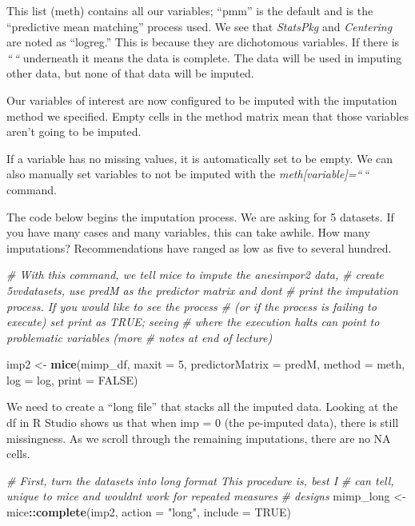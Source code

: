 \documentclass[
  11pt,
]{book}
\newenvironment{Shaded}{\begin{snugshade}}{\end{snugshade}}
\newcommand{\AttributeTok}[1]{\textcolor[rgb]{0.27,0.27,0.27}{#1}}
\newcommand{\CommentTok}[1]{\textcolor[rgb]{0.37,0.37,0.37}{\textit{#1}}}
\newcommand{\ConstantTok}[1]{\textcolor[rgb]{0.37,0.37,0.37}{#1}}
\newcommand{\DecValTok}[1]{\textcolor[rgb]{0.06,0.06,0.06}{#1}}
\newcommand{\FunctionTok}[1]{\textcolor[rgb]{0.27,0.27,0.27}{\textbf{#1}}}
\newcommand{\NormalTok}[1]{#1}
\newcommand{\OtherTok}[1]{\textcolor[rgb]{0.37,0.37,0.37}{#1}}
\newcommand{\SpecialCharTok}[1]{\textcolor[rgb]{0.43,0.43,0.43}{\textbf{#1}}}
\newcommand{\StringTok}[1]{\textcolor[rgb]{0.5,0.5,0.5}{#1}}
\begin{document}
This list (meth) contains all our variables; ``pmm'' is the default and is the ``predictive mean matching'' process used. We see that \emph{StatsPkg} and \emph{Centering} are noted as ``logreg.'' This is because they are dichotomous variables. If there is \emph{``\,``} underneath it means the data is complete. The data will be used in imputing other data, but none of that data will be imputed.

Our variables of interest are now configured to be imputed with the imputation method we specified. Empty cells in the method matrix mean that those variables aren't going to be imputed.

If a variable has no missing values, it is automatically set to be empty. We can also manually set variables to not be imputed with the \emph{meth{[}variable{]}=``\,``} command.

The code below begins the imputation process. We are asking for 5 datasets. If you have many cases and many variables, this can take awhile. How many imputations? Recommendations have ranged as low as five to several hundred.

\begin{Shaded}
\begin{Highlighting}[]
\CommentTok{\# With this command, we tell mice to impute the anesimpor2 data,}
\CommentTok{\# create 5vvdatasets, use predM as the predictor matrix and don\textquotesingle{}t}
\CommentTok{\# print the imputation process.  If you would like to see the process}
\CommentTok{\# (or if the process is failing to execute) set print as TRUE; seeing}
\CommentTok{\# where the execution halts can point to problematic variables (more}
\CommentTok{\# notes at end of lecture)}

\NormalTok{imp2 }\OtherTok{\textless{}{-}} \FunctionTok{mice}\NormalTok{(mimp\_df, }\AttributeTok{maxit =} \DecValTok{5}\NormalTok{, }\AttributeTok{predictorMatrix =}\NormalTok{ predM, }\AttributeTok{method =}\NormalTok{ meth,}
    \AttributeTok{log =}\NormalTok{ log, }\AttributeTok{print =} \ConstantTok{FALSE}\NormalTok{)}
\end{Highlighting}
\end{Shaded}

We need to create a ``long file'' that stacks all the imputed data. Looking at the df in R Studio shows us that when imp = 0 (the pe-imputed data), there is still missingness. As we scroll through the remaining imputations, there are no NA cells.

\begin{Shaded}
\begin{Highlighting}[]
\CommentTok{\# First, turn the datasets into long format This procedure is, best I}
\CommentTok{\# can tell, unique to mice and wouldn\textquotesingle{}t work for repeated measures}
\CommentTok{\# designs}
\NormalTok{mimp\_long }\OtherTok{\textless{}{-}}\NormalTok{ mice}\SpecialCharTok{::}\FunctionTok{complete}\NormalTok{(imp2, }\AttributeTok{action =} \StringTok{"long"}\NormalTok{, }\AttributeTok{include =} \ConstantTok{TRUE}\NormalTok{)}
\end{Highlighting}
\end{Shaded}
\end{document}
